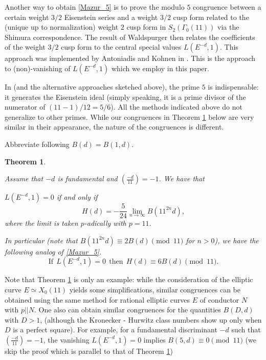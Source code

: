\documentclass[11pt,letterpaper]{amsart}
\newtheorem{thm}{Theorem}
\theoremstyle{remark}
\begin{document}
Another way to obtain \eqref{Mazur_5} is to prove the modulo $5$ congruence between a certain weight $3/2$ Eisenstein series and a weight $3/2$ cusp form related to the (unique up to normalization)  weight $2$ cusp form in $S_2(\Gamma_0(11))$ via the Shimura correspondence. 
The result of Waldspurger \cite{Waldspurger} then relates the coefficients of the weight $3/2$ cusp form to the central special values $L(E^{-d},1)$. This approach was implemented by Antoniadis and Kohnen in \cite{Ant_Kohnen}. This is the approach to (non)-vanishing of $L(E^{-d},1)$ which we employ in this paper.

In \cite[Theorem 1]{Mazur} (and the alternative approaches sketched above), the prime $5$ is indispensable: it generates the Eisenstein ideal (simply speaking, it is a prime divisor of the numerator of $(11-1)/12=5/6$). All the methods indicated above do not generalize to other primes. While our congruences in Theorem \ref{thm_cong_11}  below are very similar in their appearance, %
the nature of the congruences is different. 

Abbreviate following  \cite{Zagier_traces} $B(d)=B(1,d)$. 

\begin{thm} \label{thm_cong_11}

Assume that $-d$ is fundamental and $ \left( \frac{-d}{11} \right) = -1$. 
We have that 

$L(E^{-d},1) = 0$ if and only if 
\[
H(d) = -\frac{5}{24} \lim_{n \rightarrow \infty} B(11^{2n}d),
\]
where the limit is taken $p$-adically with $p=11$.

In particular (note that $B(11^{2n}d) \equiv 2B(d) \pmod {11}$ for $n>0$), we have the following  analog of \eqref{Mazur_5}.
\[
\text{If} ~~ L(E^{-d},1) = 0 ~~\text{then} ~~ H(d) \equiv 6B(d) \pmod{11}. 
\]
\end{thm}

Note that Theorem \ref{thm_cong_11} is only an example: while the consideration of the elliptic curve $E \simeq X_0(11)$ yields some simplifications, similar congruences can be obtained using the same method for rational elliptic curves $E$ of conductor $N$ with $p||N$. One also can obtain similar congruences for the quantities $B(D,d)$ with $D>1$,
(although the Kronecker - Hurwitz class numbers show up only when $D$ is a perfect square). For example, for a fundamental discriminant $-d$ such that $ \left( \frac{-d}{11} \right) = -1$, the vanishing $L(E^{-d},1) = 0$ implies $B(5,d) \equiv 0 \pmod {11}$ (we skip the proof which is  parallel to that of Theorem \ref{thm_cong_11})
\end{document}
